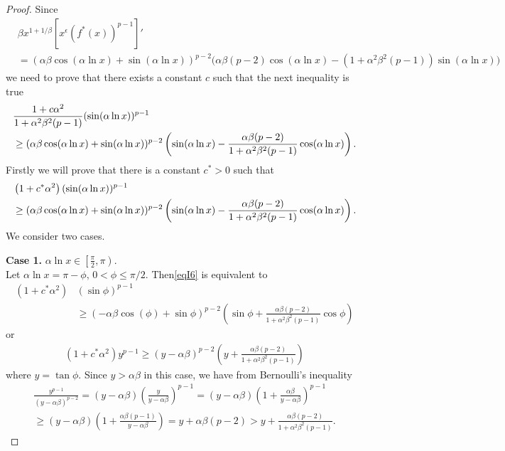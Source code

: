 \documentclass{amsart}
\theoremstyle{definition}
\theoremstyle{remark}
\numberwithin{equation}{section}
\begin{document}
\begin{proof}
Since
 \begin{align*}
&\beta x^{1+1/\beta}\left[x^\epsilon (f^*(x))^{p-1} \right]'\\
&=(\alpha \beta\cos(\alpha\ln x)+\sin(\alpha\ln x))^{p-2} \big(\alpha\beta(p-2)\cos(\alpha\ln x)-\left(1+\alpha^2\beta^2(p-1) \right)\sin(\alpha\ln x) \big)
\end{align*}
 we need to prove that there exists a constant $c$ such that   the next inequality is true
\begin{align}\label{eqI66}
\notag&\frac{1+c\alpha^2}{1+\alpha^2\beta^2( p-1)} (\sin(\alpha\ln x))^{p-1}\\ 
&\geq  (\alpha \beta\cos(\alpha\ln x)+\sin(\alpha\ln x))^{p-2}
\left(\sin(\alpha\ln x) -\frac{\alpha \beta(p-2)}{1+\alpha^2\beta^2( p-1)}\cos(\alpha\ln x)\right).
  \end{align}
  Firstly we will prove that there is a constant $c^*>0$ such that 
   \begin{align}\label{eqI6}
\notag&\left(1+c^*\alpha^2 \right) (\sin(\alpha\ln x))^{p-1}\\ 
&\geq  (\alpha \beta\cos(\alpha\ln x)+\sin(\alpha\ln x))^{p-2}
\left(\sin(\alpha\ln x) -\frac{\alpha \beta(p-2)}{1+\alpha^2\beta^2( p-1)}\cos(\alpha\ln x)\right).
  \end{align}
	We consider two cases.


	
	\textbf{Case 1.} $\alpha\ln x\in \left[\frac{\pi}{2},\pi \right)$.\\	
	Let $\alpha\ln x=\pi-\phi,\, 0<\phi\le\pi/2$. Then\eqref{eqI6} is equivalent to 
	\begin{align*}
\left(1+c^*\alpha^2 \right)&(\sin\phi)^{p-1}\\
&\geq(-\alpha \beta\cos(\phi)+\sin\phi)^{p-2}
\left(\sin\phi +\frac{\alpha \beta(p-2)}{1+\alpha^2\beta^2( p-1)}\cos\phi\right)\end{align*}
	or
	\begin{align*}
\left(1+c^*\alpha^2 \right)y^{p-1}\geq \left(y-\alpha \beta \right)^{p-2}
\left(y+\frac{\alpha\beta(p-2)}{1+\alpha^2\beta^2(p-1)} \right)
\end{align*}
where $y=\tan\phi$. Since $y>\alpha \beta$ in this case, we have from Bernoulli's inequality
\begin{align*}
\frac{y^{p-1}}{\left(y-\alpha \beta \right)^{p-2}}
=\left(y-\alpha \beta \right)\left(\frac{y}{y-\alpha \beta} \right)^{p-1}
=\left(y-\alpha \beta \right)\left(1+\frac{\alpha\beta}{y-\alpha \beta} \right)^{p-1}\\
\geq \left(y-\alpha \beta \right)\left(1+\frac{\alpha\beta(p-1)}{y-\alpha \beta} \right)
=y+\alpha\beta(p-2)>y+\frac{\alpha\beta(p-2)}{1+\alpha^2\beta^2(p-1)}.
\end{align*}
	

\end{proof}
\end{document}
